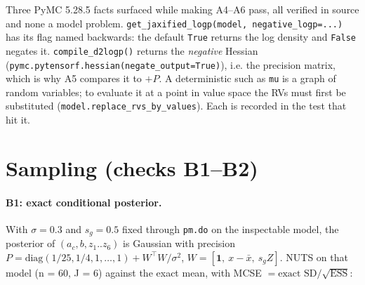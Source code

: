 \documentclass[11pt]{article}
\newcommand{\code}[1]{\texttt{#1}}
\begin{document}
Three PyMC 5.28.5 facts surfaced while making A4--A6 pass, all verified in source and
none a model problem. \code{get\_jaxified\_logp(model, negative\_logp=...)} has its flag
named backwards: the default \code{True} returns the log density and \code{False} negates
it. \code{compile\_d2logp()} returns the \emph{negative} Hessian
(\code{pymc.pytensorf.hessian(negate\_output=True)}), i.e. the precision matrix, which is
why A5 compares it to $+P$. A deterministic such as \code{mu} is a graph of random
variables; to evaluate it at a point in value space the RVs must first be substituted
(\code{model.replace\_rvs\_by\_values}). Each is recorded in the test that hit it.

\section{Sampling (checks B1--B2)}

\paragraph{B1: exact conditional posterior.} With $\sigma = 0.3$ and $s_g = 0.5$ fixed
through \code{pm.do} on the inspectable model, the posterior of $(a_c, b, z_1..z_6)$ is
Gaussian with precision $P = \mathrm{diag}(1/25, 1/4, 1,\dots,1) + W^\top W/\sigma^2$,
$W = [\mathbf 1,\ x-\bar x,\ s_g Z]$. NUTS on that model (n = 60, J = 6) against the exact
mean, with MCSE $= \text{exact SD}/\sqrt{\mathrm{ESS}}$:
\end{document}
